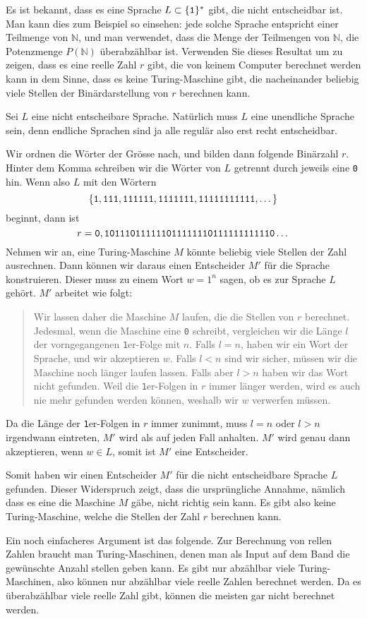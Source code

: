 Es ist bekannt, dass es eine Sprache
$L\subset \{\text{\tt 1}\}^*$ gibt, die nicht entscheidbar ist.
Man kann dies zum Beispiel so einsehen:
jede solche Sprache entspricht einer Teilmenge von $\mathbb N$,
und man verwendet, dass die Menge der Teilmengen von $\mathbb N$,
die Potenzmenge $P(\mathbb N)$ überabzählbar ist.
Verwenden Sie dieses
Resultat um zu zeigen, dass es eine reelle Zahl $r$ gibt, die von keinem
Computer berechnet werden kann in dem Sinne, dass es keine Turing-Maschine
gibt, die nacheinander beliebig viele Stellen der Binärdarstellung von $r$
berechnen
kann.

\begin{loesung}
Sei $L$ eine nicht entscheibare Sprache. Natürlich muss $L$ eine
unendliche Sprache sein, denn endliche Sprachen sind ja alle regulär
also erst recht entscheidbar.

Wir ordnen die Wörter der Grösse nach, und bilden dann folgende
Binärzahl $r$. Hinter dem Komma schreiben wir die Wörter von $L$
getrennt durch jeweils eine {\tt 0} hin. Wenn also $L$ mit
den Wörtern
\[
\{
\text{\tt 1},
\text{\tt 111},
\text{\tt 111111},
\text{\tt 1111111},
\text{\tt 11111111111},
\dots
\}
\]
beginnt, dann ist
\[
r=\text{\tt 0},\text{\tt 101110111111011111110111111111110}\dots
\]
Nehmen wir an, eine Turing-Maschine $M$ könnte beliebig viele Stellen
der Zahl ausrechnen. Dann können wir daraus einen Entscheider $M'$ für
die Sprache konstruieren. Dieser muss zu einem Wort $w=1^n$ sagen,
ob es zur Sprache $L$ gehört. $M'$ arbeitet wie folgt:

\begin{quote}
Wir lassen daher die Maschine $M$ laufen, die die Stellen von $r$ berechnet.
Jedesmal, wenn die Maschine eine
{\tt 0} schreibt, vergleichen wir die Länge $l$ der vorngegangenen
{\tt 1}er-Folge mit $n$. Falls $l=n$, haben wir ein Wort der Sprache,
und wir akzeptieren $w$. Falls $l<n$ sind wir sicher, müssen wir
die Maschine noch länger laufen lassen. Falls aber $l>n$ haben wir
das Wort nicht gefunden. Weil die {\tt 1}er-Folgen in $r$ immer
länger werden, wird es auch nie mehr gefunden werden können, weshalb
wir $w$ verwerfen müssen.
\end{quote}

Da die Länge der {\tt 1}er-Folgen in $r$ immer zunimmt, muss $l=n$
oder $l>n$ irgendwann eintreten, $M'$ wird als auf jeden Fall
anhalten. $M'$ wird genau dann akzeptieren, wenn $w\in L$, somit
ist $M'$ eine Entscheider.

Somit haben wir einen Entscheider $M'$ für die nicht entscheidbare Sprache
$L$ gefunden. Dieser Widerspruch zeigt, dass die ursprüngliche Annahme,
nämlich dass es eine die Maschine $M$ gäbe, nicht richtig sein kann.
Es gibt also keine Turing-Maschine, welche die Stellen der Zahl $r$ berechnen
kann.

Ein noch einfacheres Argument ist das folgende. Zur Berechnung von
rellen Zahlen braucht man Turing-Maschinen, denen man als Input auf
dem Band die gewünschte Anzahl stellen geben kann. Es gibt nur
abzählbar viele Turing-Maschinen, also können nur abzählbar viele
reelle Zahlen berechnet werden. Da es überabzählbar viele reelle
Zahl gibt, können die meisten gar nicht berechnet werden.
\end{loesung}
